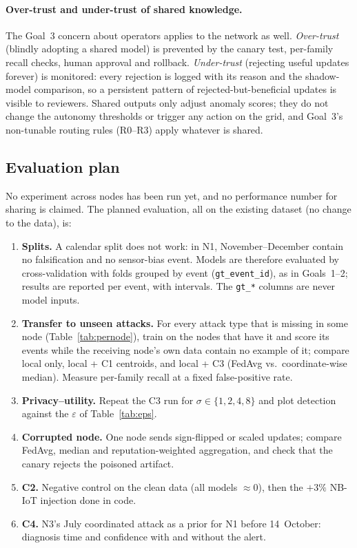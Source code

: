 \documentclass[11pt,a4paper]{article}
\newcommand{\code}[1]{\texttt{#1}}
\begin{document}
\paragraph{Over-trust and under-trust of shared knowledge.} The Goal~3 concern about operators applies to the network as well. \emph{Over-trust} (blindly adopting a shared model) is prevented by the canary test, per-family recall checks, human approval and rollback. \emph{Under-trust} (rejecting useful updates forever) is monitored: every rejection is logged with its reason and the shadow-model comparison, so a persistent pattern of rejected-but-beneficial updates is visible to reviewers. Shared outputs only adjust anomaly scores; they do not change the autonomy thresholds or trigger any action on the grid, and Goal~3's non-tunable routing rules (R0--R3) apply whatever is shared.



\subsection{Evaluation plan}
\label{sec:eval}

No experiment across nodes has been run yet, and no performance number for sharing is claimed. The planned evaluation, all on the existing dataset (no change to the data), is:
\begin{enumerate}
  \item \textbf{Splits.} A calendar split does not work: in N1, November--December contain no falsification and no sensor-bias event. Models are therefore evaluated by cross-validation with folds grouped by event (\code{gt\_event\_id}), as in Goals~1--2; results are reported per event, with intervals. The \code{gt\_*} columns are never model inputs.
  \item \textbf{Transfer to unseen attacks.} For every attack type that is missing in some node (Table~\ref{tab:pernode}), train on the nodes that have it and score its events while the receiving node's own data contain no example of it; compare local only, local + C1 centroids, and local + C3 (FedAvg vs.\ coordinate-wise median). Measure per-family recall at a fixed false-positive rate.
  \item \textbf{Privacy--utility.} Repeat the C3 run for $\sigma\in\{1,2,4,8\}$ and plot detection against the $\varepsilon$ of Table~\ref{tab:eps}.
  \item \textbf{Corrupted node.} One node sends sign-flipped or scaled updates; compare FedAvg, median and reputation-weighted aggregation, and check that the canary rejects the poisoned artifact.
  \item \textbf{C2.} Negative control on the clean data (all models $\approx0$), then the $+3\%$ NB-IoT injection done in code.
  \item \textbf{C4.} N3's July coordinated attack as a prior for N1 before 14~October: diagnosis time and confidence with and without the alert.
\end{enumerate}
\end{document}
